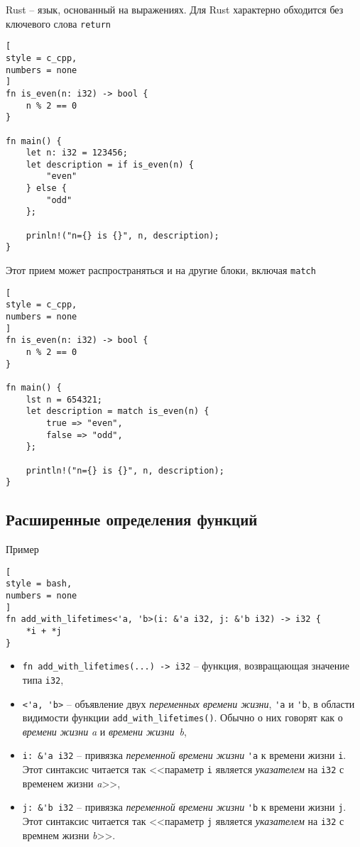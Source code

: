 \documentclass[%
	11pt,
	a4paper,
	utf8,
		]{article}
\begin{document}
Rust -- язык, основанный на выражениях. Для Rust характерно обходится без ключевого слова \texttt{return}
\begin{lstlisting}[
style = c_cpp,
numbers = none
]
fn is_even(n: i32) -> bool {
    n % 2 == 0
}

fn main() {
    let n: i32 = 123456;
    let description = if is_even(n) {
        "even"
    } else {
        "odd"
    };

    prinln!("n={} is {}", n, description);
}
\end{lstlisting}

Этот прием может распространяться и на другие блоки, включая \texttt{match}
\begin{lstlisting}[
style = c_cpp,
numbers = none
]
fn is_even(n: i32) -> bool {
    n % 2 == 0
}

fn main() {
    lst n = 654321;
    let description = match is_even(n) {
        true => "even",
        false => "odd",
    };

    println!("n={} is {}", n, description);
}
\end{lstlisting}

\subsection{Расширенные определения функций}

Пример
\begin{lstlisting}[
style = bash,
numbers = none
]
fn add_with_lifetimes<'a, 'b>(i: &'a i32, j: &'b i32) -> i32 {
    *i + *j
}
\end{lstlisting}
\begin{itemize}
	\item \verb|fn add_with_lifetimes(...) -> i32| -- функция, возвращающая значение типа \verb|i32|,
	
	\item \verb|<'a, 'b>| -- объявление двух \emph{переменных времени жизни}, \verb|'a| и \verb|'b|, в области видимости функции \verb|add_with_lifetimes()|. Обычно о них говорят как о \emph{времени жизни} \emph{a} и \emph{времени жизни}~\emph{b},
	
	\item \verb|i: &'a i32| -- привязка {\color{blue}\emph{переменной времени жизни} \verb|'a|} к времени жизни \texttt{i}. Этот синтаксис читается так <<параметр \texttt{i} является \emph{указателем} на \verb|i32| с {\color{blue}временем жизни \emph{a}}>>,
	
	\item \verb|j: &'b i32| -- привязка {\color{blue}\emph{переменной времени жизни} \verb|'b|} к времени жизни \texttt{j}. Этот синтаксис читается так <<параметр \texttt{j} является \emph{указателем} на \verb|i32| с {\color{blue}времнем жизни \emph{b}}>>.
\end{itemize}
\end{document}
